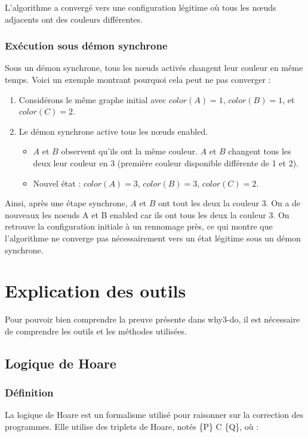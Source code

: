 \documentclass[11pt]{article}
\begin{document}
L'algorithme a convergé vers une configuration légitime où tous les nœuds adjacents ont des couleurs différentes.

\subsubsection{Exécution sous démon synchrone}
\label{sec:org2e001c1}
Sous un démon synchrone, tous les nœuds activés changent leur couleur en même temps. Voici un exemple montrant pourquoi cela peut ne pas converger :

\begin{enumerate}
\item Considérons le même graphe initial avec \(color(A) = 1\), \(color(B) = 1\), et \(color(C) = 2\).

\item Le démon synchrone active tous les nœuds enabled.
\begin{itemize}
\item \(A\) et \(B\) observent qu'ils ont la même couleur. \(A\) et \(B\) changent tous les deux leur couleur en 3 (première couleur disponible différente de 1 et 2).
\item Nouvel état : \(color(A) = 3\), \(color(B) = 3\), \(color(C) = 2\).
\end{itemize}
\end{enumerate}

Ainsi, après une étape synchrone, \(A\) et \(B\) ont tout les deux la couleur 3.
On a de nouveaux les noeuds A et B enabled car ils ont tous les deux la couleur 3.
On retrouve la configuration initiale à un rennomage près, ce qui montre que l'algorithme ne converge pas nécessairement vers un état légitime sous un démon synchrone.

\section{Explication des outils}
\label{sec:org445b583}
Pour pouvoir bien comprendre la preuve présente dans why3-do, il est nécessaire de comprendre les outils et les méthodes utilisées.

\subsection{Logique de Hoare}
\label{sec:org2ccc4dc}

\subsubsection{Définition}
\label{sec:org6f96898}
La logique de Hoare est un formalisme utilisé pour raisonner sur la correction des programmes. Elle utilise des triplets de Hoare, notés \{P\} C \{Q\}, où :
\end{document}
